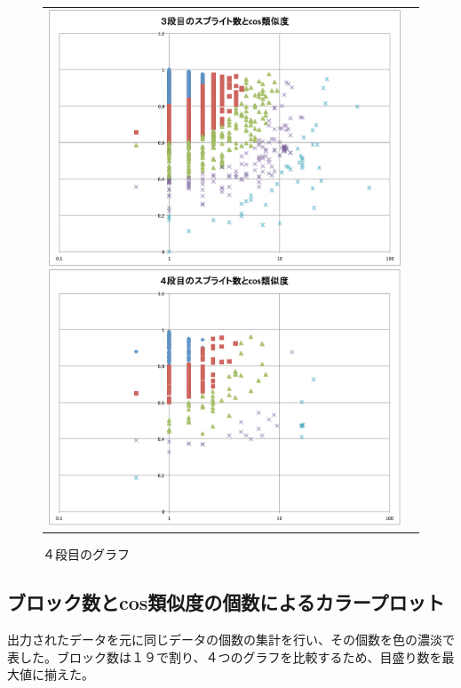 \documentclass[a4paper,10pt,onecolumn,oneside,openany]{jsbook}
\begin{document}
\begin{figure}[h]
\begin{tabular}{cc}
\begin{minipage}[t]{0.45\hsize}
	 \centering
	 \includegraphics[keepaspectratio, scale = 0.25]{graph_3_splite.pdf}
	 \caption{３段目のグラフ}
	 \label{third_splite_cos}
	\end{minipage}
        \begin{minipage}[t]{0.45\hsize}
	 \centering
	 \includegraphics[keepaspectratio, scale = 0.25]{graph_4_splite.pdf}
	 \caption{４段目のグラフ}
	 \label{fourth_splite_cos}
	\end{minipage}
 \end{tabular}
 \end{figure}
 
\newpage
\subsection{ブロック数とcos類似度の個数によるカラープロット}
出力されたデータを元に同じデータの個数の集計を行い、その個数を色の濃淡で表した。ブロック数は１９で割り、４つのグラフを比較するため、目盛り数を最大値に揃えた。
\end{document}
